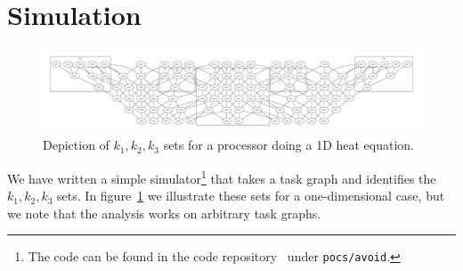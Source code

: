 \documentclass[11pt,fleqn]{article}
\begin{document}
\section{Simulation}

\begin{figure}[ht]
  \includegraphics[scale=.15]{nodegraph-1}
  \caption{Depiction of $k_1,k_2,k_3$ sets for a processor doing a 1D
    heat equation.}
  \label{fig:1dk123}
\end{figure}

We have written a simple simulator\footnote{The code can be found in
  the code repository~\cite{IMPcode-repo} under {\tt pocs/avoid}.} that takes a task graph and
identifies the $k_1,k_2,k_3$ sets. In figure~\ref{fig:1dk123} we
illustrate these sets for a one-dimensional case, but we note that the
analysis works on arbitrary task graphs.
\end{document}
